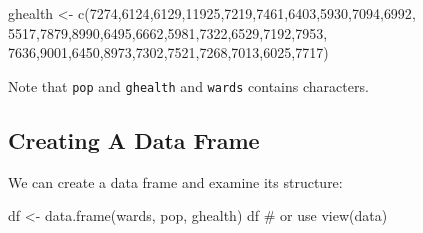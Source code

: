 \documentclass[
  letterpaper,
  krantz2]{style/krantz}
\newenvironment{Shaded}{\begin{snugshade}}{\end{snugshade}}
\newcommand{\CommentTok}[1]{\textcolor[rgb]{0.37,0.37,0.37}{#1}}
\newcommand{\DecValTok}[1]{\textcolor[rgb]{0.68,0.00,0.00}{#1}}
\newcommand{\FunctionTok}[1]{\textcolor[rgb]{0.28,0.35,0.67}{#1}}
\newcommand{\NormalTok}[1]{\textcolor[rgb]{0.00,0.23,0.31}{#1}}
\newcommand{\OtherTok}[1]{\textcolor[rgb]{0.00,0.23,0.31}{#1}}
\begin{document}
\begin{Shaded}
\begin{Highlighting}[]
\NormalTok{ghealth }\OtherTok{\textless{}{-}} \FunctionTok{c}\NormalTok{(}\DecValTok{7274}\NormalTok{,}\DecValTok{6124}\NormalTok{,}\DecValTok{6129}\NormalTok{,}\DecValTok{11925}\NormalTok{,}\DecValTok{7219}\NormalTok{,}\DecValTok{7461}\NormalTok{,}\DecValTok{6403}\NormalTok{,}\DecValTok{5930}\NormalTok{,}\DecValTok{7094}\NormalTok{,}\DecValTok{6992}\NormalTok{,}
                 \DecValTok{5517}\NormalTok{,}\DecValTok{7879}\NormalTok{,}\DecValTok{8990}\NormalTok{,}\DecValTok{6495}\NormalTok{,}\DecValTok{6662}\NormalTok{,}\DecValTok{5981}\NormalTok{,}\DecValTok{7322}\NormalTok{,}\DecValTok{6529}\NormalTok{,}\DecValTok{7192}\NormalTok{,}\DecValTok{7953}\NormalTok{,}
                 \DecValTok{7636}\NormalTok{,}\DecValTok{9001}\NormalTok{,}\DecValTok{6450}\NormalTok{,}\DecValTok{8973}\NormalTok{,}\DecValTok{7302}\NormalTok{,}\DecValTok{7521}\NormalTok{,}\DecValTok{7268}\NormalTok{,}\DecValTok{7013}\NormalTok{,}\DecValTok{6025}\NormalTok{,}\DecValTok{7717}\NormalTok{)}
\end{Highlighting}
\end{Shaded}

Note that \texttt{pop} and \texttt{ghealth} and \texttt{wards} contains
characters.

\hypertarget{creating-a-data-frame}{%
\subsection{Creating A Data Frame}\label{creating-a-data-frame}}

We can create a data frame and examine its structure:

\begin{Shaded}
\begin{Highlighting}[]
\NormalTok{df }\OtherTok{\textless{}{-}} \FunctionTok{data.frame}\NormalTok{(wards, pop, ghealth)}
\NormalTok{df }\CommentTok{\# or use view(data)}
\end{Highlighting}
\end{Shaded}
\end{document}
